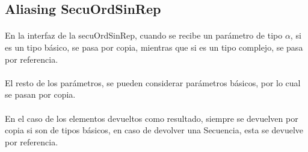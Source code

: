 \subsection*{Aliasing SecuOrdSinRep}

\paragraph{}
En la interfaz de la secuOrdSinRep, cuando se recibe un par\'ametro de tipo $\alpha$, si es un tipo b\'asico, se pasa por copia, mientras que si es un tipo complejo, se pasa por referencia.

\paragraph{}
El resto de los par\'ametros, se pueden considerar par\'ametros b\'asicos, por lo cual se pasan por copia.

\paragraph{}
En el caso de los elementos devueltos como resultado, siempre se devuelven por copia si son de tipos b\'asicos, en caso de devolver una Secuencia, esta se devuelve por referencia.